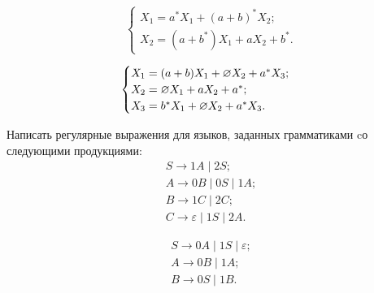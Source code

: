 \begin{equation}
    \begin{cases}
        X_1 = a^{\ast}X_1 + (a+b)^{\ast}X_2;\\
        X_2 = (a+b^{\ast})X_1 + aX_2 + b^\ast.
    \end{cases}
\end{equation}

\begin{equation}
    \begin{cases}
        X_1 = (a+b)X_1 + \varnothing X_2 + a^{\ast}X_3; \\
        X_2 = \varnothing X_1 + aX_2 + a^{\ast}; \\
        X_3 = b^{\ast}X_1 + \varnothing X_2 + a^{\ast}X_3.
    \end{cases}
\end{equation}

Написать регулярные выражения для языков, заданных грамматиками cо
следующими продукциями:
\begin{equation}
\begin{array}{l}
S \to 1A \mid 2S; \\
A \to 0B \mid 0S \mid 1A; \\
B \to 1C \mid 2C; \\
C \to \varepsilon \mid 1S \mid 2A.
\end{array}
\end{equation}

\begin{equation}
\begin{array}{l}
S \to 0A \mid 1S \mid \varepsilon ;\\
A \to 0B \mid 1A;\\
B \to 0S \mid 1B.
\end{array}
\end{equation}
